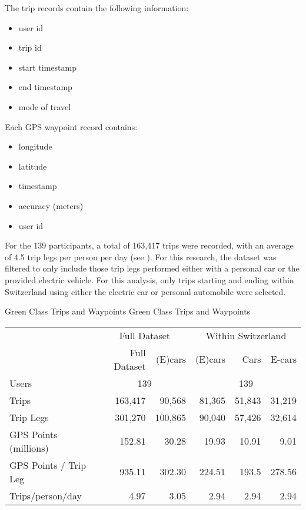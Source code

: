 The trip records contain the following information:
\begin{itemize}
  \item user id
  \item trip id
  \item start timestamp
  \item end timestamp
  \item mode of travel
\end{itemize}

Each GPS waypoint record contains: 
\begin{itemize}
  \item longitude
  \item latitude
  \item timestamp
  \item accuracy (meters)
  \item user id
\end{itemize}

For the 139 participants, a total of 163,417 trips were recorded, with an average of 4.5 trip legs per person per day (see ).
For this research, the dataset was filtered to only include those trip legs performed either with a personal car or the provided electric vehicle.
For this analysis, only trips starting and ending within Switzerland using either the electric car or personal automobile were selected. 


\createtable%
{Green Class Trips and Waypoints}%
{Green Class Trips and Waypoints}%
{\label{tab:green_class_gps_summary}}%
{%
\begin{tabular}{ l | r r | r r r}
                    & \multicolumn{2}{c|}{Full Dataset}  & \multicolumn{3}{c}{Within Switzerland}  \\ 
 
                    & Full Dataset  &   (E)cars & (E)cars   & Cars & E-cars \\ 
\hline
 Users            & \multicolumn{2}{c|}{139} & \multicolumn{3}{c}{139} \\  
 Trips            & 163,417       & 90,568    & 81,365    & 51,843    & 31,219\\  
 Trip Legs        & 301,270     & 100,865   & 90,040    & 57,426    & 32,614\\  
 GPS Points (millions)      &  152.81  &   30.28    &    19.93    & 10.91 & 9.01 \\ 
 GPS Points / Trip Leg &  935.11   &    302.30    &  224.51     &   193.5   &  278.56  \\  
 Trips/person/day & 4.97          & 3.05      & 2.94      & 2.94      & 2.94 \\  
\end{tabular}
}
{}



